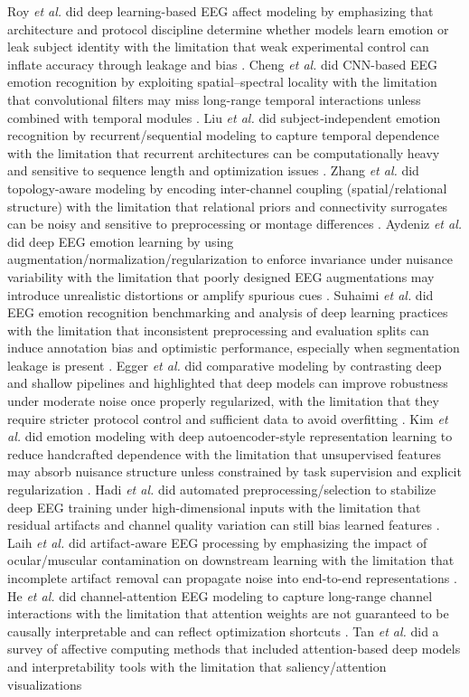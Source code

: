 \documentclass{WileyMSP-template}
\begin{document}
Roy \textit{et al.} did deep learning-based EEG affect modeling by emphasizing that architecture and protocol discipline determine whether models learn emotion or leak subject identity with the limitation that weak experimental control can inflate accuracy through leakage and bias \cite{yroyhb2019deeplear}. Cheng \textit{et al.} did CNN-based EEG emotion recognition by exploiting spatial--spectral locality with the limitation that convolutional filters may miss long-range temporal interactions unless combined with temporal modules \cite{jcheng2021emotionr}. Liu \textit{et al.} did subject-independent emotion recognition by recurrent/sequential modeling to capture temporal dependence with the limitation that recurrent architectures can be computationally heavy and sensitive to sequence length and optimization issues \cite{sliuxw2020subjecti}. Zhang \textit{et al.} did topology-aware modeling by encoding inter-channel coupling (spatial/relational structure) with the limitation that relational priors and connectivity surrogates can be noisy and sensitive to preprocessing or montage differences \cite{tzhang2019spatialt}. Aydeniz \textit{et al.} did deep EEG emotion learning by using augmentation/normalization/regularization to enforce invariance under nuisance variability with the limitation that poorly designed EEG augmentations may introduce unrealistic distortions or amplify spurious cues \cite{saydn2020deeplear}. Suhaimi \textit{et al.} did EEG emotion recognition benchmarking and analysis of deep learning practices with the limitation that inconsistent preprocessing and evaluation splits can induce annotation bias and optimistic performance, especially when segmentation leakage is present \cite{nssuha2020eegbased}. Egger \textit{et al.} did comparative modeling by contrasting deep and shallow pipelines and highlighted that deep models can improve robustness under moderate noise once properly regularized, with the limitation that they require stricter protocol control and sufficient data to avoid overfitting \cite{megger2019emotionr}. Kim \textit{et al.} did emotion modeling with deep autoencoder-style representation learning to reduce handcrafted dependence with the limitation that unsupervised features may absorb nuisance structure unless constrained by task supervision and explicit regularization \cite{shkimh2021asemoaut}. Hadi \textit{et al.} did automated preprocessing/selection to stabilize deep EEG training under high-dimensional inputs with the limitation that residual artifacts and channel quality variation can still bias learned features \cite{sphadi2021automati}. Laih \textit{et al.} did artifact-aware EEG processing by emphasizing the impact of ocular/muscular contamination on downstream learning with the limitation that incomplete artifact removal can propagate noise into end-to-end representations \cite{cqlaih2018artifact}. He \textit{et al.} did channel-attention EEG modeling to capture long-range channel interactions with the limitation that attention weights are not guaranteed to be causally interpretable and can reflect optimization shortcuts \cite{hheand2019channela}. Tan \textit{et al.} did a survey of affective computing methods that included attention-based deep models and interpretability tools with the limitation that saliency/attention visualizations 
\end{document}
